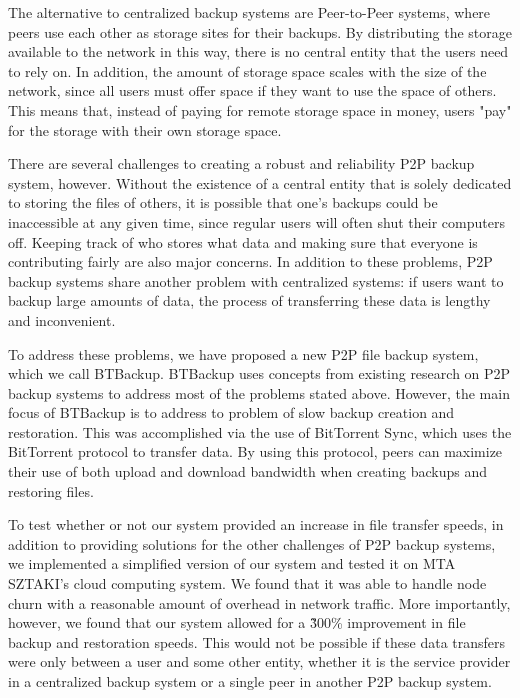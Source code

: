 \documentclass[12pt]{report}
\begin{document}
The alternative to centralized backup systems are Peer-to-Peer systems, where peers use each other as storage sites for their backups. By distributing the storage available to the network in this way, there is no central entity that the users need to rely on. In addition, the amount of storage space scales with the size of the network, since all users must offer space if they want to use the space of others. This means that, instead of paying for remote storage space in money, users "pay" for the storage with their own storage space.

There are several challenges to creating a robust and reliability P2P backup system, however. Without the existence of a central entity that is solely dedicated to storing the files of others, it is possible that one's backups could be inaccessible at any given time, since regular users will often shut their computers off. Keeping track of who stores what data and making sure that everyone is contributing fairly are also major concerns. In addition to these problems, P2P backup systems share another problem with centralized systems: if users want to backup large amounts of data, the process of transferring these data is lengthy and inconvenient.

To address these problems, we have proposed a new P2P file backup system, which we call BTBackup. BTBackup uses concepts from existing research on P2P backup systems to address most of the problems stated above. However, the main focus of BTBackup is to address to problem of slow backup creation and restoration. This was accomplished via the use of BitTorrent Sync, which uses the BitTorrent protocol to transfer data. By using this protocol, peers can maximize their use of both upload and download bandwidth when creating backups and restoring files.

To test whether or not our system provided an increase in file transfer speeds, in addition to providing solutions for the other challenges of P2P backup systems, we implemented a simplified version of our system and tested it on MTA SZTAKI's cloud computing system. We found that it was able to handle node churn with a reasonable amount of overhead in network traffic. More importantly, however, we found that our system allowed for a \~300\% improvement in file backup and restoration speeds. This would not be possible if these data transfers were only between a user and some other entity, whether it is the service provider in a centralized backup system or a single peer in another P2P backup system.
\end{document}
